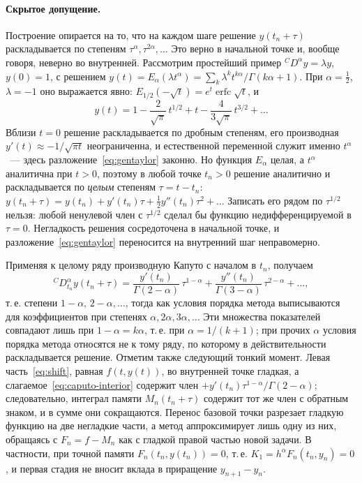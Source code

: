 \documentclass[11pt,a4paper]{article}
\theoremstyle{plain}
\theoremstyle{definition}
\newcommand{\G}{\Gamma}
\begin{document}
\paragraph{Скрытое допущение.} Построение опирается на то, что на каждом шаге решение $y(t_n+\tau)$ раскладывается по степеням $\tau^{\alpha},\tau^{2\alpha},\dots$ Это верно в начальной точке и, вообще говоря, неверно во внутренней. Рассмотрим простейший пример ${}^{C}\!D^{\alpha}y=\lambda y$, $y(0)=1$, с решением $y(t)=E_{\alpha}(\lambda t^{\alpha})=\sum_k\lambda^kt^{k\alpha}/\G(k\alpha+1)$. При $\alpha=\frac12$, $\lambda=-1$ оно выражается явно: $E_{1/2}(-\sqrt t)=e^{t}\operatorname{erfc}\sqrt t$, и
\[
y(t)=1-\frac{2}{\sqrt\pi}\,t^{1/2}+t-\frac{4}{3\sqrt\pi}\,t^{3/2}+\dots
\]
Вблизи $t=0$ решение раскладывается по дробным степеням, его производная $y'(t)\approx-1/\sqrt{\pi t}$ неограниченна, и естественной переменной служит именно $t^{\alpha}$~--- здесь разложение~\eqref{eq:gentaylor} законно. Но функция $E_{\alpha}$ целая, а $t^{\alpha}$ аналитична при $t>0$, поэтому в любой точке $t_n>0$ решение аналитично и раскладывается по \emph{целым} степеням $\tau=t-t_n$: $y(t_n+\tau)=y(t_n)+y'(t_n)\tau+\frac12y''(t_n)\tau^2+\dots$ Записать его рядом по $\tau^{1/2}$ нельзя: любой ненулевой член с $\tau^{1/2}$ сделал бы функцию недифференцируемой в $\tau=0$. Негладкость решения сосредоточена в начальной точке, и разложение~\eqref{eq:gentaylor} переносится на внутренний шаг неправомерно.

Применяя к целому ряду производную Капуто с началом в $t_n$, получаем
\begin{equation}\label{eq:caputo-interior}
{}^{C}\!D^{\alpha}_{t_n}y(t_n+\tau)=\frac{y'(t_n)}{\G(2-\alpha)}\,\tau^{1-\alpha}+\frac{y''(t_n)}{\G(3-\alpha)}\,\tau^{2-\alpha}+\dots,
\end{equation}
т.\,е. степени $1-\alpha,\,2-\alpha,\dots$, тогда как условия порядка метода выписываются для коэффициентов при степенях $\alpha,2\alpha,3\alpha,\dots$ Эти множества показателей совпадают лишь при $1-\alpha=k\alpha$, т.\,е. при $\alpha=1/(k+1)$; при прочих $\alpha$ условия порядка метода относятся не к тому ряду, по которому в действительности раскладывается решение. Отметим также следующий тонкий момент. Левая часть~\eqref{eq:shift}, равная $f(t,y(t))$, во внутренней точке гладкая, а слагаемое~\eqref{eq:caputo-interior} содержит член $+y'(t_n)\tau^{1-\alpha}/\G(2-\alpha)$; следовательно, интеграл памяти $M_n(t_n+\tau)$ содержит тот же член с обратным знаком, и в сумме они сокращаются. Перенос базовой точки разрезает гладкую функцию на две негладкие части, а метод аппроксимирует лишь одну из них, обращаясь с $F_n=f-M_n$ как с гладкой правой частью новой задачи. В частности, при точной памяти $F_n(t_n,y(t_n))=0$, т.\,е. $K_1=h^{\alpha}F_n(t_n,y_n)=0$, и первая стадия не вносит вклада в приращение $y_{n+1}-y_n$.
\end{document}
